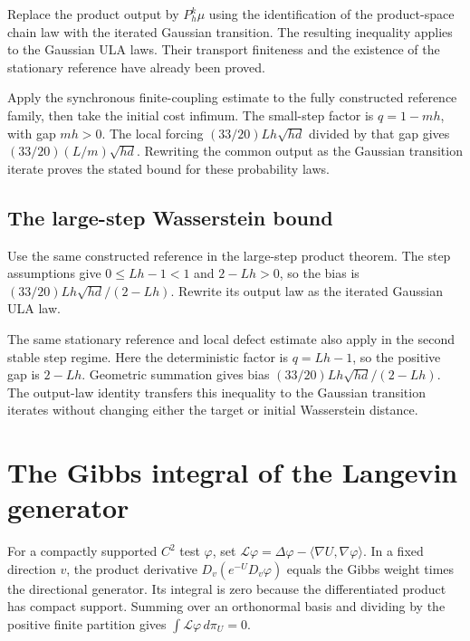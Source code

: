 \documentclass[11pt,a4paper]{report}
\begin{document}
Replace the product output by \(P_h^k\mu\) using the identification of the product-space chain law with the iterated Gaussian transition. The resulting inequality applies to the Gaussian ULA laws. Their transport finiteness and the existence of the stationary reference have already been proved.



Apply the synchronous finite-coupling estimate to the fully constructed reference family, then take the initial cost infimum. The small-step factor is \(q=1-mh\), with gap \(mh>0\). The local forcing \((33/20)Lh\sqrt{hd}\) divided by that gap gives \((33/20)(L/m)\sqrt{hd}\). Rewriting the common output as the Gaussian transition iterate proves the stated bound for these probability laws.

\subsection{\texorpdfstring{The large-step Wasserstein bound}{The large-step Wasserstein bound}}
\label{report-step-UnadjustedLangevin-CanonicalULA-lean-8}


Use the same constructed reference in the large-step product theorem. The step assumptions give \(0\le Lh-1<1\) and \(2-Lh>0\), so the bias is \((33/20)Lh\sqrt{hd}/(2-Lh)\). Rewrite its output law as the iterated Gaussian ULA law.



The same stationary reference and local defect estimate also apply in the second stable step regime. Here the deterministic factor is \(q=Lh-1\), so the positive gap is \(2-Lh\). Geometric summation gives bias \((33/20)Lh\sqrt{hd}/(2-Lh)\). The output-law identity transfers this inequality to the Gaussian transition iterates without changing either the target or initial Wasserstein distance.

\section{\texorpdfstring{The Gibbs integral of the Langevin generator}{The Gibbs integral of the Langevin generator}}
\label{proof-module-UnadjustedLangevin-Generator-lean}


For a compactly supported \(C^2\) test \(\varphi\), set \(\mathcal L\varphi=\Delta\varphi-\langle\nabla U,\nabla\varphi\rangle\). In a fixed direction \(v\), the product derivative \(D_v(e^{-U}D_v\varphi)\) equals the Gibbs weight times the directional generator. Its integral is zero because the differentiated product has compact support. Summing over an orthonormal basis and dividing by the positive finite partition gives \(\int\mathcal L\varphi\,d\pi_U=0\).
\end{document}
